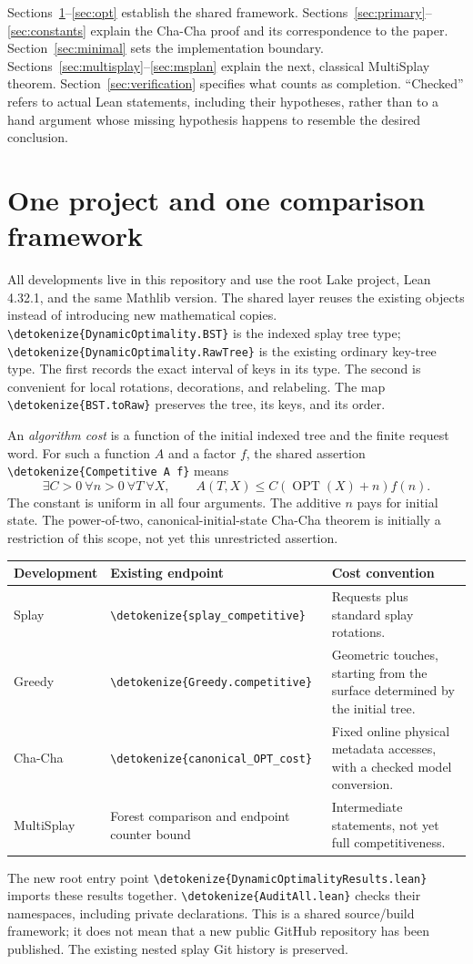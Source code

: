 \documentclass[11pt,a4paper]{article}
\newcommand{\OPT}{\operatorname{OPT}}
\newcommand{\lean}[1]{{\small\expandafter\nolinkurl\expandafter{\detokenize{#1}}}}
\newcommand{\nextpage}{\clearpage}
\begin{document}
Sections~\ref{sec:framework}--\ref{sec:opt} establish the shared framework.
Sections~\ref{sec:primary}--\ref{sec:constants} explain the Cha-Cha
proof and its correspondence to the paper. Section~\ref{sec:minimal}
sets the implementation boundary. Sections~\ref{sec:multisplay}--\ref{sec:msplan}
explain the next, classical MultiSplay theorem. Section~\ref{sec:verification}
specifies what counts as completion. ``Checked'' refers to actual Lean
statements, including their hypotheses, rather than to a hand argument
whose missing hypothesis happens to resemble the desired conclusion.

\nextpage
\section{One project and one comparison framework}\label{sec:framework}
All developments live in this repository and use
the root Lake project, Lean 4.32.1, and the same Mathlib version. The shared
layer reuses the existing objects instead of introducing new mathematical
copies. \lean{DynamicOptimality.BST} is the indexed splay tree type;
\lean{DynamicOptimality.RawTree} is the existing ordinary key-tree type.
The first records the exact interval of keys in its type. The second is
convenient for local rotations, decorations, and relabeling. The map
\lean{BST.toRaw} preserves the tree, its keys, and its order.

An \emph{algorithm cost} is a function of the initial indexed tree and
the finite request word. For such a function $A$ and a factor $f$, the
shared assertion \lean{Competitive A f} means
\[
 \exists C>0\ \forall n>0\ \forall T\ \forall X,
 \qquad A(T,X)\le C(\OPT(X)+n)f(n).
\]
The constant is uniform in all four arguments. The additive $n$ pays for
initial state. The power-of-two, canonical-initial-state Cha-Cha theorem is
initially a restriction of this scope, not yet this unrestricted assertion.

\begin{center}\small
\begin{tabular}{p{23mm}p{57mm}p{66mm}}
\toprule
Development & Existing endpoint & Cost convention \\
\midrule
Splay & \lean{splay_competitive} & Requests plus standard splay rotations. \\
Greedy & \lean{Greedy.competitive} & Geometric touches, starting from the surface determined by the initial tree. \\
Cha-Cha & \lean{canonical_OPT_cost} & Fixed online physical metadata accesses, with a checked model conversion. \\
MultiSplay & Forest comparison and endpoint counter bound & Intermediate statements, not yet full competitiveness. \\
\bottomrule
\end{tabular}
\end{center}
The new root entry point \lean{DynamicOptimalityResults.lean} imports
these results together. \lean{AuditAll.lean} checks their namespaces,
including private declarations. This is a shared source/build framework;
it does not mean that a new public GitHub repository has been published.
The existing nested splay Git history is preserved.
\end{document}
